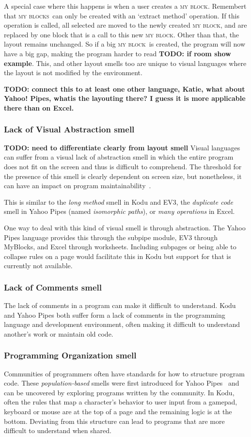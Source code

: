 \documentclass{sig-alternate}
\newcommand{\todo}[1]{\textbf{TODO: #1}}
\newcommand{\mbs}{\textsc{my blocks}}
\newcommand{\mb}{\textsc{my block}}
\begin{document}
A special case where this happens is when a user creates a \mb. Remembert that \mbs~can only be created with an `extract method' operation. If this operation is called, all selected are moved to the newly created \mb, and are replaced by one block that is a call to this new \mb. Other than that, the layout remains unchanged. So if a big \mb~is created, the program will now have a big gap, making the program harder to read \todo{if room show example}. This, and other layout smells too are unique to visual languages where the layout is not modified by the environment.

\todo{connect this to at least one other language, Katie, what about Yahoo! Pipes, whatis the layouting there? I guess it is more applicable there than on Excel.}


\subsubsection{Lack of Visual Abstraction smell}
\todo{need to differentiate clearly from layout smell}
Visual languages can suffer from a visual lack of abstraction smell in which the entire program does not fit on the screen and thus is difficult to comprehend. The threshold for the presence of this smell is clearly dependent on screen size, but nonetheless, it can have an impact on program maintainability~\cite{StoleeTSE2013}. 

This is similar to the \emph{long method} smell in Kodu and EV3, the \emph{duplicate code} smell in Yahoo Pipes (named \emph{isomorphic paths}), or \emph{many operations} in Excel.
	
One way to deal with this kind of visual smell is through abstraction. The Yahoo Pipes language provides this through the subpipe module, EV3 through MyBlocks, and Excel through worksheets.  Including subpages or being able to collapse rules on a page would facilitate this in Kodu but support for that is currently not available. 


\subsubsection{Lack of Comments smell}
The lack of comments in a program can make it difficult to understand. Kodu and Yahoo Pipes both suffer form a lack of comments in the programming language and development environment, often making it difficult to understand another's work or maintain old code. 


\subsubsection{Programming Organization smell}
Communities of programmers often have standards for how to structure program code. These \emph{population-based} smells were first introduced for Yahoo Pipes~\cite{StoleeTSE2013} and can be uncovered by exploring programs written by the community. In Kodu, often the rules that map a character's behavior to user input from a gamepad, keyboard or mouse are at the top of a page and the remaining logic is at the bottom. Deviating from this structure can lead to programs that are more difficult to understand when shared. 
\end{document}
